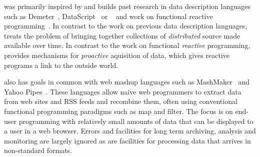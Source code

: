 
\padsd{} was primarily inspired by and builds past research in 
data description languages such as Demeter~\cite{lieberherr:demeter}, 
DataScript~\cite{gpce02} or
\pads{}~\cite{fisher+:pads,mandelbaum+:pads-ml} and work on functional reactive 
programming~\cite{elliot+:frp}.  In contrast to the work on previous
data description languages, \padsd{} treats the problem of bringing together
collections of {\em distributed} source made available over time.  In
contrast to the work on functional {\em reactive} programming, \padsd{}
provides mechanisms for {\em proactive} aquisition of data, which gives
reactive programs a link to the outside world.

\padsd{} also has goals in common with 
web mashup languages such as MashMaker~\cite{ennals+:mashmaker} 
and Yahoo Pipes~\cite{yahoopipes}.  These languages allow naive web 
programmers to extract data from web sites and RSS feeds and recombine them,
often using conventional functional programming paradigms such as
map and filter.  The focus is on end-user programming with relatively
small amounts of data that can be displayed to a user in a web
browser. Errors and facilities for long term archiving, analysis and monitoring
are largely ignored as are facilities for processing data that arrives
in non-standard formats.
%


